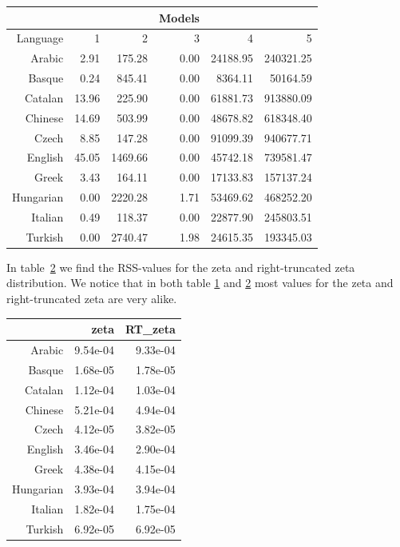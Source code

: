 \documentclass[paper=a4, fontsize=11pt]{scrartcl} %
\theoremstyle{plain}
\begin{document}
\begin{table}[h!!!]
\centering
{} \label{diffAIC}
\begin{tabular}{rrrrrr}
 &&&Models&&\\
  \hline
 Language & 1 & 2 & 3 & 4 & 5 \\ 
  \hline
Arabic & 2.91 & 175.28 & 0.00 & 24188.95 & 240321.25 \\ 
  Basque & 0.24 & 845.41 & 0.00 & 8364.11 & 50164.59 \\ 
  Catalan & 13.96 & 225.90 & 0.00 & 61881.73 & 913880.09 \\ 
  Chinese & 14.69 & 503.99 & 0.00 & 48678.82 & 618348.40 \\ 
  Czech & 8.85 & 147.28 & 0.00 & 91099.39 & 940677.71 \\ 
  English & 45.05 & 1469.66 & 0.00 & 45742.18 & 739581.47 \\ 
  Greek & 3.43 & 164.11 & 0.00 & 17133.83 & 157137.24 \\ 
  Hungarian & 0.00 & 2220.28 & 1.71 & 53469.62 & 468252.20 \\ 
  Italian & 0.49 & 118.37 & 0.00 & 22877.90 & 245803.51 \\ 
  Turkish & 0.00 & 2740.47 & 1.98 & 24615.35 & 193345.03 \\ 
   \hline
\end{tabular}
\end{table}

In table~\ref{rss} we find the RSS-values for the zeta and right-truncated zeta distribution. We notice that in both table \ref{diffAIC} and \ref{rss} most values for the zeta and right-truncated zeta are very alike.

\begin{table}[ht]
\centering
{}\label{rss}
\begin{tabular}{rrr}
  \hline
 & zeta & RT\_zeta \\ 
  \hline
Arabic & 9.54e-04 & 9.33e-04 \\ 
  Basque & 1.68e-05 & 1.78e-05 \\ 
  Catalan & 1.12e-04 & 1.03e-04 \\ 
  Chinese & 5.21e-04 & 4.94e-04 \\ 
  Czech & 4.12e-05 & 3.82e-05 \\ 
  English & 3.46e-04 & 2.90e-04 \\ 
  Greek & 4.38e-04 & 4.15e-04 \\ 
  Hungarian & 3.93e-04 & 3.94e-04 \\ 
  Italian & 1.82e-04 & 1.75e-04 \\ 
  Turkish & 6.92e-05 & 6.92e-05 \\ 
   \hline
\end{tabular}
\end{table}
\end{document}

